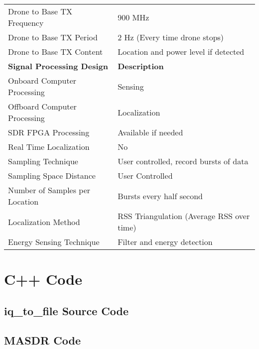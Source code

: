 \begin{table}[h]
\begin{tabular}{|l|l|}
            Drone to Base TX Frequency            & 900 MHz                                   \\
            Drone to Base TX Period               & 2 Hz (Every time drone stops)             \\
            Drone to Base TX Content              & Location and power level if detected      \\
    \hline  \textbf{Signal Processing Design}     & \textbf{Description}                      \\ \hline
            Onboard Computer Processing           & Sensing                                   \\
            Offboard Computer Processing          & Localization                              \\
            SDR FPGA Processing                   & Available if needed                       \\
            Real Time Localization                & No                                        \\
            Sampling Technique                    & User controlled, record bursts of data    \\
            Sampling Space Distance               & User Controlled                           \\
            Number of Samples per Location        & Bursts every half second                  \\
            Localization Method                   & RSS Triangulation (Average RSS over time) \\
            Energy Sensing Technique              & Filter and energy detection               \\ \hline
\end{tabular}
\end{table}\par
\pagebreak
\chapter{C++ Code}
\section{iq\_to\_file Source Code}\label{app:iq_to_file}

\pagebreak
\section{MASDR Code}\label{app:masdr_code}
